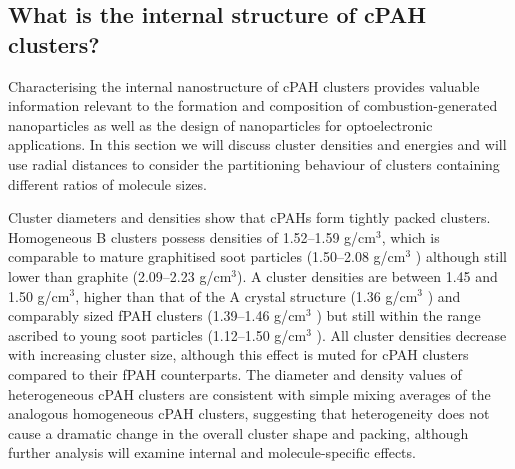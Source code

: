 \subsection{What is the internal structure of cPAH clusters?}
Characterising the internal nanostructure of cPAH clusters provides valuable information relevant to the formation and composition of combustion-generated nanoparticles as well as the design of nanoparticles for optoelectronic applications. In this section we will discuss cluster densities and energies and will use radial distances to consider the partitioning behaviour of clusters containing different ratios of molecule sizes.

Cluster diameters and densities show that cPAHs form tightly packed clusters. Homogeneous B clusters possess densities of 1.52--1.59 g/$\text{cm}^{3}$, which is comparable to mature graphitised soot particles (1.50--2.08 g/$\text{cm}^{3}$ \cite{johansson2017evolution}) although still lower than graphite (2.09--2.23 g/$\text{cm}^{3}$). A cluster densities are between 1.45 and 1.50 g/$\text{cm}^{3}$, higher than that of the A crystal structure (1.36 g/$\text{cm}^{3}$ \cite{Petrukhina2005}) and comparably sized fPAH clusters (1.39--1.46 g/$\text{cm}^{3}$ \cite{chen2014size}) but still within the range ascribed to young soot particles (1.12--1.50 g/$\text{cm}^{3}$ \cite{totton2010modelling,camacho2015mobility}). All cluster densities decrease with increasing cluster size, although this effect is muted for cPAH clusters compared to their fPAH counterparts. The diameter and density values of heterogeneous cPAH clusters are consistent with simple mixing averages of the analogous homogeneous cPAH clusters, suggesting that heterogeneity does not cause a dramatic change in the overall cluster shape and packing, although further analysis will examine internal and molecule-specific effects.


